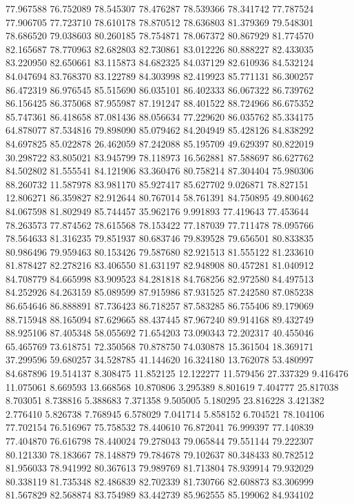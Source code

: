 77.967588
76.752089
78.545307
78.476287
78.539366
78.341742
77.787524
77.906705
77.723710
78.610178
78.870512
78.636803
81.379369
79.548301
78.686520
79.038603
80.260185
78.754871
78.067372
80.867929
81.774570
82.165687
78.770963
82.682803
82.730861
83.012226
80.888227
82.433035
83.220950
82.650661
83.115873
84.682325
84.037129
82.610936
84.532124
84.047694
83.768370
83.122789
84.303998
82.419923
85.771131
86.300257
86.472319
86.976545
85.515690
86.035101
86.402333
86.067322
86.739762
86.156425
86.375068
87.955987
87.191247
88.401522
88.724966
86.675352
85.747361
86.418658
87.081436
88.056634
77.229620
86.035762
85.334175
64.878077
87.534816
79.898090
85.079462
84.204949
85.428126
84.838292
84.697825
85.022878
26.462059
87.242088
85.195709
49.629397
80.822019
30.298722
83.805021
83.945799
78.118973
16.562881
87.588697
86.627762
84.502802
81.555541
84.121906
83.360476
80.758214
87.304404
75.980306
88.260732
11.587978
83.981170
85.927417
85.627702
9.026871
78.827151
12.806271
86.359827
82.912644
80.767014
58.761391
84.750895
49.800462
84.067598
81.802949
85.744457
35.962176
9.991893
77.419643
77.453644
78.263573
77.874562
78.615568
78.153422
77.187039
77.711478
78.095766
78.564633
81.316235
79.851937
80.683746
79.839528
79.656501
80.833835
80.986496
79.959463
80.153426
79.587680
82.921513
81.555122
81.233610
81.878427
82.278216
83.406550
81.631197
82.948908
80.457281
81.040912
84.708779
84.665998
83.909523
84.281818
84.768256
82.972580
84.497513
84.252926
84.263159
85.089599
87.915986
87.931525
87.242580
87.085238
86.654646
86.888891
87.736423
86.718257
87.583285
86.755406
89.179069
88.715948
88.165094
87.629665
88.437445
87.967240
89.914168
89.432749
88.925106
87.405348
58.055692
71.654203
73.090343
72.202317
40.455046
65.465769
73.618751
72.350568
70.878750
74.030878
15.361504
18.369171
37.299596
59.680257
34.528785
41.144620
16.324180
13.762078
53.480997
84.687896
19.514137
8.308475
11.852125
12.122277
11.579456
27.337329
9.416476
11.075061
8.669593
13.668568
10.870806
3.295389
8.801619
7.404777
25.817038
8.703051
8.738816
5.388683
7.371358
9.505005
5.180295
23.816228
3.421382
2.776410
5.826738
7.768945
6.578029
7.041714
5.858152
6.704521
78.104106
77.702154
76.516967
75.758532
78.440610
76.872041
76.999397
77.140839
77.404870
76.616798
78.440024
79.278043
79.065844
79.551144
79.222307
80.121330
78.183667
78.148879
79.784678
79.102637
80.348433
80.782512
81.956033
78.941992
80.367613
79.989769
81.713804
78.939914
79.932029
80.338119
81.735348
82.486839
82.702339
81.730766
82.608873
83.306999
81.567829
82.568874
83.754989
83.442739
85.962555
85.199062
84.934102

